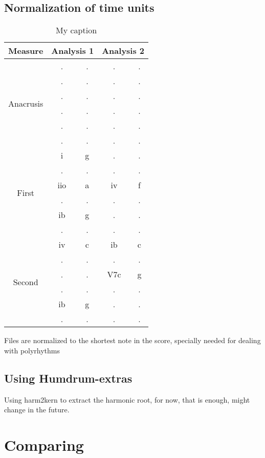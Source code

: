   \subsection{Normalization of time units}
	\begin{table}[]
	\centering
	\begin{tabular}{|c|c|c|c|c|}
	\hline
	Measure & \multicolumn{2}{c|}{Analysis 1} & \multicolumn{2}{c|}{Analysis 2} \\ \hline
	\multirow{6}{*}{Anacrusis} & . & . & . & . \\ \cline{2-5}
	 & . & . & . & . \\ \cline{2-5}
	 & . & . & . & . \\ \cline{2-5}
	 & . & . & . & . \\ \cline{2-5}
	 & . & . & . & . \\ \cline{2-5}
	 & . & . & . & . \\ \hline
	\multirow{6}{*}{First} & i & g & . & . \\ \cline{2-5}
	 & . & . & . & . \\ \cline{2-5}
	 & iio & a & iv & f \\ \cline{2-5}
	 & . & . & . & . \\ \cline{2-5}
	 & ib & g & . & . \\ \cline{2-5}
	 & . & . & . & . \\ \hline
	\multirow{6}{*}{Second} & iv & c & ib & c \\ \cline{2-5}
	 & . & . & . & . \\ \cline{2-5}
	 & . & . & V7c & g \\ \cline{2-5}
	 & . & . & . & . \\ \cline{2-5}
	 & ib & g & . & . \\ \cline{2-5}
	 & . & . & . & . \\ \hline
	\end{tabular}
	\caption{My caption}
	\label{my-label}
	\end{table}

	Files are normalized to the shortest note in the score, specially needed for dealing with polyrhythms


	\subsection{Using Humdrum-extras}
  Using harm2kern to extract the harmonic root, for now, that is enough, might change in the future.
\section{Comparing}
